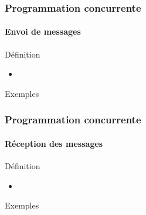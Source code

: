 \begin{frame}
  \frametitle{Programmation concurrente}
  \framesubtitle{Envoi de messages}

  \begin{block}{Définition}
    \begin{itemize}
    \item
    \end{itemize}
  \end{block}

  \begin{exampleblock}{Exemples}
  \end{exampleblock}

\end{frame}

\begin{frame}
  \frametitle{Programmation concurrente}
  \framesubtitle{Réception des messages}

  \begin{block}{Définition}
    \begin{itemize}
    \item
    \end{itemize}
  \end{block}

  \begin{exampleblock}{Exemples}
  \end{exampleblock}

\end{frame}

